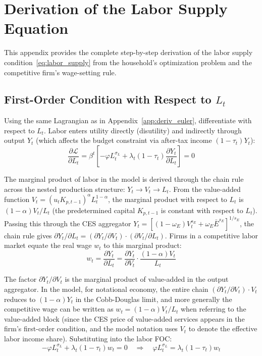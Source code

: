 \documentclass[12pt, a4paper]{article}
\begin{document}
\section{Derivation of the Labor Supply Equation} \label{app:deriv_labor}

This appendix provides the complete step-by-step derivation of the labor supply condition~\eqref{eq:labor_supply} from the household's optimization problem and the competitive firm's wage-setting rule.

\subsection*{First-Order Condition with Respect to $L_t$}

Using the same Lagrangian as in Appendix~\ref{app:deriv_euler}, differentiate with respect to $L_t$. Labor enters utility directly (disutility) and indirectly through output $Y_t$ (which affects the budget constraint via after-tax income $(1-\tau_t)Y_t$):
\begin{equation*}
\frac{\partial \mathcal{L}}{\partial L_t}
= \beta^t\left[-\varphi L_t^{\sigma_L} + \lambda_t (1-\tau_t) \frac{\partial Y_t}{\partial L_t}\right] = 0
\end{equation*}

\noindent The marginal product of labor in the model is derived through the chain rule across the nested production structure: $Y_t \to V_t \to L_t$. From the value-added function $V_t = (u_t K_{p,t-1})^\alpha L_t^{1-\alpha}$, the marginal product with respect to $L_t$ is $(1-\alpha)V_t/L_t$ (the predetermined capital $K_{p,t-1}$ is constant with respect to $L_t$). Passing this through the CES aggregator $Y_t = [(1-\omega_E)V_t^{s_E} + \omega_E \bar{E}^{s_E}]^{1/s_E}$, the chain rule gives $\partial Y_t/\partial L_t = (\partial Y_t / \partial V_t)\cdot(\partial V_t / \partial L_t)$. Firms in a competitive labor market equate the real wage $w_t$ to this marginal product:
\begin{equation*}
w_t = \frac{\partial Y_t}{\partial L_t}
= \frac{\partial Y_t}{\partial V_t} \cdot \frac{(1-\alpha)V_t}{L_t}
\end{equation*}

The factor $\partial Y_t / \partial V_t$ is the marginal product of value-added in the output aggregator. In the model, for notational economy, the entire chain $(\partial Y_t/\partial V_t)\cdot V_t$ reduces to $(1-\alpha)Y_t$ in the Cobb-Douglas limit, and more generally the competitive wage can be written as $w_t = (1-\alpha) V_t / L_t$ when referring to the value-added block (since the CES price of value-added services appears in the firm's first-order condition, and the model notation uses $V_t$ to denote the effective labor income share). Substituting into the labor FOC:
\begin{equation*}
-\varphi L_t^{\sigma_L} + \lambda_t (1-\tau_t) w_t = 0
\quad \Longrightarrow \quad
\varphi L_t^{\sigma_L} = \lambda_t (1-\tau_t) w_t
\end{equation*}
\end{document}
